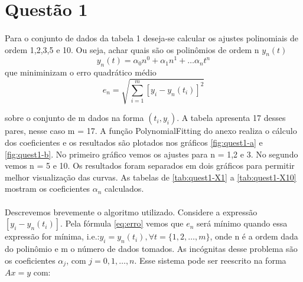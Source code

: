 \section*{Questão 1}

\paragraph{}Para o conjunto de dados da tabela 1 deseja-se
calcular os ajustes polinomiais de ordem 1,2,3,5 e 10.
 Ou seja, achar quais são os polinômios de ordem n $y_{n}(t)$ 
\begin{displaymath}
y_n(t) = \alpha_{0}n^{0} + \alpha_{1}n^{1} + \ldots 
									\alpha_{n}t^{n}
\end{displaymath}
que 
miniminizam o erro quadrático médio 
\begin{equation}
e_{n} = \sqrt{\sum _{i = 1}^{m} [y_{i} - y_{n}(t_{i})]^2}
\label{eq:erro}
\end{equation}

sobre o conjunto de m dados na forma $(t_{i}, y_{i})$. 
A tabela apresenta 17 desses pares, nesse caso m = 17. 
A função PolynomialFitting do anexo realiza o cálculo dos 
coeficientes e os resultados são plotados nos gráficos 
\ref{fig:quest1-a} e \ref{fig:quest1-b}. No primeiro gráfico
vemos os ajustes para n = 1,2 e 3. No segundo vemos n = 5 e 10.
Os resultados foram separados em dois gráficos para permitir 
melhor visualização das curvas. As tabelas de \ref{tab:quest1-X1} 
a \ref{tab:quest1-X10} mostram os coeficientes $\alpha_n$ calculados.

\paragraph{}Descrevemos brevemente o algoritmo utilizado.
Considere a expressão $[y_{i} - y_{n}(t_{i})]$. Pela fórmula
\ref{eq:erro} vemos que $e_n$ será mínimo quando essa expressão
for mínima, i.e.:$y_{i} = y_{n}(t_{i}), \forall 
t = \{ 1, 2, \ldots, m \}$, onde n é a ordem dada do polinômio  e m o número
de dados tomados. As incógnitas desse problema são os coeficientes $\alpha_j$,
com $j = {0, 1, \ldots, n}$. Esse sistema pode ser reescrito na forma $Ax = y$
com:

